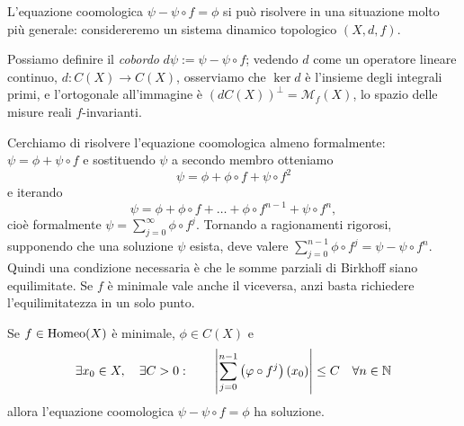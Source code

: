 L'equazione coomologica $\psi-\psi\circ f=\phi$ si può risolvere in una situazione molto più generale: considereremo un sistema dinamico topologico $(X,d,f)$.

\begin{oss} Possiamo definire il \emph{cobordo} $d\psi:=\psi-\psi\circ f$; vedendo $d$ come un operatore lineare continuo, $d:C(X)\to C(X)$, 
osserviamo che $\ker d$ è l'insieme degli integrali primi, e l'ortogonale all'immagine è $(dC(X))^\perp
=\mathcal{M}_f(X)$, lo spazio delle misure reali $f$-invarianti.\end{oss}

Cerchiamo di risolvere l'equazione coomologica almeno formalmente:
$\psi=\phi+\psi\circ f$ e sostituendo $\psi$ a secondo membro otteniamo
\[ \psi=\phi+\phi\circ f+\psi\circ f^2 \]
e iterando
\[ \psi=\phi+\phi\circ f+\dots+\phi\circ f^{n-1}+\psi\circ f^n, \]
cioè formalmente $\psi=\sum_{j=0}^\infty \phi\circ f^j$. Tornando a ragionamenti rigorosi, supponendo che una soluzione $\psi$ esista, deve valere
$\sum_{j=0}^{n-1}\phi\circ f^j=\psi-\psi\circ f^n$. Quindi una condizione necessaria è che le somme parziali
di Birkhoff siano equilimitate. Se $f$ è minimale vale anche il viceversa, anzi basta richiedere l'equilimitatezza in un solo punto.


\begin{teo}Se $f\in\operatorname{Homeo}(X)$ è minimale, $\phi\in C(X)$ e 
\[\exists x_0\in X, \quad \exists C>0: \qquad \left|\sum_{j=0}^{n-1}\left(\varphi\circ f^j\right)(x_0)\right|\le C \quad \forall n\in\mathbb{N}\]
allora l'equazione coomologica $\psi-\psi\circ f=\phi$ ha soluzione.
\end{teo}



